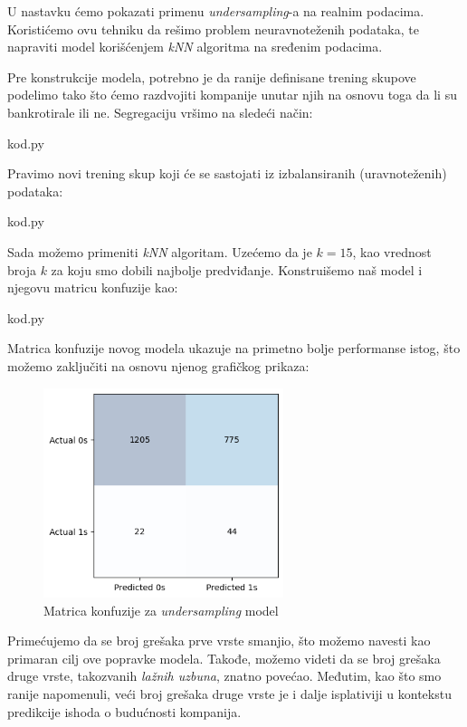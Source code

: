 \documentclass[12pt]{article}
\theoremstyle{definition}
\theoremstyle{remark}
\begin{document}
U nastavku ćemo pokazati primenu \emph{undersampling}-a na realnim podacima. Koristićemo ovu tehniku da rešimo problem neuravnoteženih podataka, te napraviti model korišćenjem \emph{kNN} algoritma na sređenim podacima.


Pre konstrukcije modela, potrebno je da ranije definisane trening skupove podelimo tako što ćemo razdvojiti kompanije unutar njih na osnovu toga da li su bankrotirale ili ne. Segregaciju vršimo na sledeći način:

\hfill

{kod.py}

\hfill

Pravimo novi trening skup koji će se sastojati iz izbalansiranih (uravnoteženih) podataka:

\hfill

{kod.py}

\hfill

  Sada možemo primeniti \emph{kNN} algoritam. Uzećemo da je $k=15$, kao vrednost broja $k$ za koju smo dobili najbolje predviđanje. Konstruišemo naš model i njegovu matricu konfuzije kao:

\hfill

{kod.py}

\hfill

Matrica konfuzije novog modela ukazuje na primetno bolje performanse istog, što možemo zaključiti na osnovu njenog grafičkog prikaza:

 \begin{figure}[htp]
    \centering
    \includegraphics[width=7cm]{output_12_0.png}
    \caption{Matrica konfuzije za \emph{undersampling} model}
    \label{fig:galaxy}
\end{figure}

Primećujemo da se broj grešaka prve vrste smanjio, što možemo navesti kao primaran cilj ove popravke modela. Takođe, možemo videti da se broj grešaka druge vrste, takozvanih \emph{lažnih uzbuna}, znatno povećao. Međutim, kao što smo ranije napomenuli, veći broj grešaka druge vrste je i dalje isplativiji u kontekstu predikcije ishoda o budućnosti kompanija.  
\end{document}
